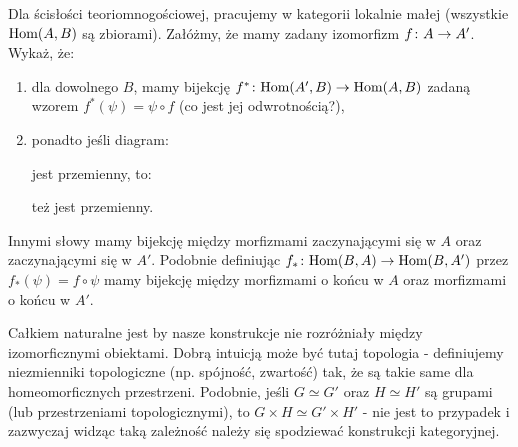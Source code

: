\begin{exc}
  \label{exc:izomorficzne_obiekty}
  Dla ścisłości teoriomnogościowej, pracujemy w kategorii lokalnie małej (wszystkie $\textrm{Hom}(A, B)$ są zbiorami). Załóżmy, że mamy zadany izomorfizm $f\colon A\to A'$. Wykaż, że:
  \begin{enumerate}
    \item dla dowolnego $B$, mamy bijekcję $f^*\colon \textrm{Hom}(A', B)\to \textrm{Hom}(A, B)$ zadaną wzorem $f^*(\psi) = \psi \circ f$ (co jest jej odwrotnością?),
    \item ponadto jeśli diagram:
      \begin{center}
      \end{center}
     jest przemienny, to:
     \begin{center}
    \end{center}
    też jest przemienny.
  \end{enumerate}
  Innymi słowy mamy bijekcję między morfizmami zaczynającymi się w $A$ oraz zaczynającymi się w $A'$. Podobnie definiując $f_* \colon \textrm{Hom}(B, A)\to \textrm{Hom}(B, A')$ przez $f_*(\psi) = f\circ \psi$ mamy bijekcję między morfizmami o końcu w $A$ oraz morfizmami o końcu w $A'$.
\end{exc}

\begin{remk}
  Całkiem naturalne jest by nasze konstrukcje nie rozróżniały między izomorficznymi obiektami. Dobrą intuicją może być tutaj topologia - definiujemy niezmienniki topologiczne (np. spójność, zwartość) tak, że są takie same dla homeomorficznych przestrzeni. Podobnie, jeśli $G\simeq G'$ oraz $H\simeq H'$ są grupami (lub przestrzeniami topologicznymi), to $G\times H \simeq G'\times H'$ - nie jest to przypadek i zazwyczaj widząc taką zależność należy się spodziewać konstrukcji kategoryjnej.
\end{remk}

